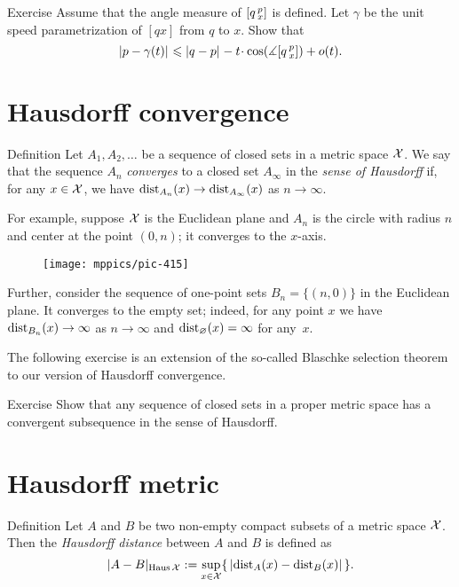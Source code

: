 \begin{thm}{Exercise}\label{ex:first-var}
Assume that the angle measure of $[q\,{}^{p}_{x}]$ is defined.
Let $\gamma$ be the unit speed parametrization of $[qx]$ from $q$ to $x$.
Show that
\[\dist{p}{\gamma(t)}{}
\le
\dist{q}{p}{}-t\cdot \cos(\mangle\hinge q p x)+o(t).\]

\end{thm}

\section{Hausdorff convergence}\label{sec:Hausdorff convergence}

\begin{thm}{Definition}\label{def:gen-Haus-conv}
Let $A_1,A_2,\dots$ be a sequence of closed sets in a metric space $\mathcal{X}$.
We say that the sequence $A_n$ \emph{converges} to a closed set $A_\infty$ in the {}\emph{sense of Hausdorff} if, for any $x\in\mathcal{X}$, we have
$\mathrm{dist}_{A_n}(x)\to \mathrm{dist}_{A_\infty}(x)$ as $n\to\infty$.
\end{thm}

For example, suppose $\mathcal{X}$ is the Euclidean plane and $A_n$ is the circle with radius $n$ and center at the point $(0,n)$; it converges to the $x$-axis.

\begin{figure}[ht!]
\vskip-0mm
\centering
\texttt{[image: mppics/pic-415]}
\end{figure}

Further, consider the sequence of one-point sets $B_n=\{(n,0)\}$ in the Euclidean plane.
It converges to the empty set;
indeed, for any point $x$ we have $\mathrm{dist}_{B_n}(x)\to\infty$ as $n\to \infty$ and $\mathrm{dist}_{\varnothing}(x)= \infty$ for any~$x$.

The following exercise is an extension of the so-called Blaschke selection theorem to our version of Hausdorff convergence.

\begin{thm}{Exercise}\label{ex:generalized-selection}
Show that any sequence of closed sets in a proper metric space has a convergent subsequence in the sense of Hausdorff.
\end{thm}

\section{Hausdorff metric}

\begin{thm}{Definition}\label{def:hausdorff-convergence}
Let $A$ and $B$ be two non-empty compact subsets of a metric space $\mathcal{X}$.
Then the \emph{Hausdorff distance} between $A$ and $B$ is defined as 
$$|A-B|_{\operatorname{\rm Haus}\nolimits\mathcal{X}}
\mathrel{:=}
\sup_{x\in \mathcal{X}}\{\,|\mathrm{dist}_A(x)-\mathrm{dist}_B(x)|\,\}.
$$

\end{thm}

